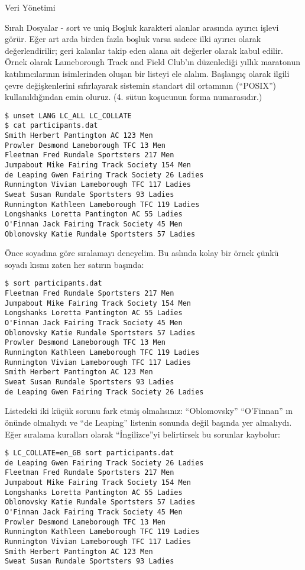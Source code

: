 \begin{section}{Veri Yönetimi}
\begin{subsection}{Sıralı Dosyalar - sort ve uniq}
Boşluk karakteri alanlar arasında ayırıcı işlevi görür. Eğer art arda birden fazla boşluk varsa sadece ilki ayırıcı olarak değerlendirilir; geri kalanlar takip eden alana ait değerler olarak kabul edilir. Örnek olarak Lameborough Track and Field Club'ın düzenlediği yıllık maratonun katılımcılarının isimlerinden oluşan bir listeyi ele alalım. Başlangıç olarak ilgili çevre değişkenlerini sıfırlayarak sistemin standart dil ortamının (“POSIX”) kullanıldığından emin oluruz. (4. sütun koşucunun forma numarasıdır.)

\footnotesize
\begin{verbatim}
$ unset LANG LC_ALL LC_COLLATE
$ cat participants.dat
Smith Herbert Pantington AC 123 Men
Prowler Desmond Lameborough TFC 13 Men
Fleetman Fred Rundale Sportsters 217 Men
Jumpabout Mike Fairing Track Society 154 Men
de Leaping Gwen Fairing Track Society 26 Ladies
Runnington Vivian Lameborough TFC 117 Ladies
Sweat Susan Rundale Sportsters 93 Ladies
Runnington Kathleen Lameborough TFC 119 Ladies
Longshanks Loretta Pantington AC 55 Ladies
O'Finnan Jack Fairing Track Society 45 Men
Oblomovsky Katie Rundale Sportsters 57 Ladies
\end{verbatim}
\normalsize

Önce soyadına göre sıralamayı deneyelim. Bu aslında kolay bir örnek çünkü soyadı kısmı zaten her satırın başında:

\footnotesize
\begin{verbatim}
$ sort participants.dat
Fleetman Fred Rundale Sportsters 217 Men
Jumpabout Mike Fairing Track Society 154 Men
Longshanks Loretta Pantington AC 55 Ladies
O'Finnan Jack Fairing Track Society 45 Men
Oblomovsky Katie Rundale Sportsters 57 Ladies
Prowler Desmond Lameborough TFC 13 Men
Runnington Kathleen Lameborough TFC 119 Ladies
Runnington Vivian Lameborough TFC 117 Ladies
Smith Herbert Pantington AC 123 Men
Sweat Susan Rundale Sportsters 93 Ladies
de Leaping Gwen Fairing Track Society 26 Ladies
\end{verbatim}
\normalsize

Listedeki iki küçük sorunu fark etmiş olmalısınız: “Oblomovsky” “O’Finnan” ın önünde olmalıydı ve “de Leaping” listenin sonunda değil başında yer almalıydı.  Eğer sıralama kuralları olarak “İngilizce”yi belirtirsek bu sorunlar kaybolur:

\footnotesize
\begin{verbatim}
$ LC_COLLATE=en_GB sort participants.dat
de Leaping Gwen Fairing Track Society 26 Ladies
Fleetman Fred Rundale Sportsters 217 Men
Jumpabout Mike Fairing Track Society 154 Men
Longshanks Loretta Pantington AC 55 Ladies
Oblomovsky Katie Rundale Sportsters 57 Ladies
O'Finnan Jack Fairing Track Society 45 Men
Prowler Desmond Lameborough TFC 13 Men
Runnington Kathleen Lameborough TFC 119 Ladies
Runnington Vivian Lameborough TFC 117 Ladies
Smith Herbert Pantington AC 123 Men
Sweat Susan Rundale Sportsters 93 Ladies
\end{verbatim}
\normalsize


\end{subsection}
\end{section}
